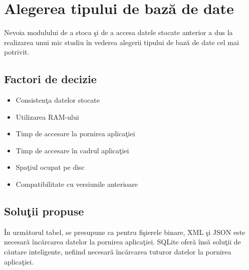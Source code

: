 \label{cap2}


\label{Chapter2} %

\thispagestyle{fancy}

\section{Alegerea tipului de bază de date} 
	Nevoia modulului de a stoca şi de a accesa datele stocate anterior a dus la realizarea unui mic studiu în vederea alegerii tipului de bază de date cel mai potrivit.

	\subsection{Factori de decizie} 
	\begin{itemize}
	 \setlength\itemsep{0em}
		\item Consistenţa datelor stocate
		\item Utilizarea RAM-ului
		\item Timp de accesare la pornirea aplicaţiei
		\item Timp de accesare în cadrul aplicaţiei
		\item Spaţiul ocupat pe disc
		\item Compatibilitate cu versiunile anterioare
	\end{itemize}

	\subsection{Soluţii propuse}
	În următorul tabel, se presupune ca pentru fişierele binare, XML şi JSON este necesară încărcarea datelor la pornirea aplicaţiei. SQLite oferă însă soluţii de căutare inteligente, nefiind necesară încărcarea tuturor datelor la pornirea aplicaţiei.

